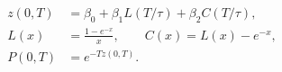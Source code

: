 \documentclass{equation-sheet}
\begin{document}
\begin{equation*}
\begin{aligned}
z(0,T)
  &= \beta_0 + \beta_1 L(T/\tau) + \beta_2 C(T/\tau), \\[0.45em]
L(x) &= \frac{1-e^{-x}}{x},
  \qquad C(x)=L(x)-e^{-x}, \\[0.45em]
P(0,T) &= e^{-Tz(0,T)}.
\end{aligned}
\end{equation*}
\end{document}
